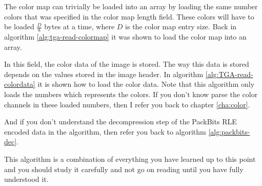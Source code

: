 
The color map can trivially be loaded into an array by loading the
same number colors that was specified in the color map length field. These
colors will have to be loaded $\frac{D}{8}$ bytes at a time, where $D$
is the color map entry size. Back in algorithm
\ref{alg:tga-read-colormap} it was shown to load the color map into an
array.


In this field, the color data of the image is stored. The way this
data is stored depends on the values stored in the image header. In
algorithm \ref{alg:TGA-read-colordata} it is shown how to load the
color data. Note that this algorithm only loads the numbers which
represents the colors. If you don't know parse the color channels in
these loaded numbers, then I refer you back to chapter
\ref{cha:color}.

And if you don't understand the decompression step of the PackBits RLE
encoded data in the algorithm, then refer you back to algorithm
\ref{alg:packbits-dec}.

This algorithm is a combination of everything you have learned up to
this point and you should study it carefully and not go on reading until
you have fully understood it.


